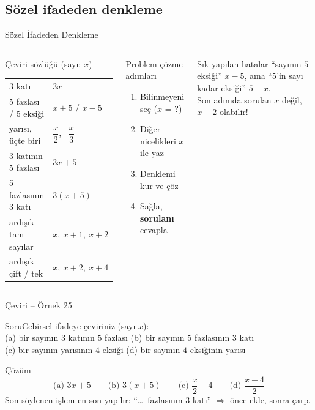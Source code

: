 \documentclass[aspectratio=169,11pt]{beamer}
\newcommand{\soru}[3]{%
\begin{frame}{#1}
  \begin{block}{Soru}\large #2\end{block}
  \pause
  \begin{exampleblock}{Çözüm}\large #3\end{exampleblock}
\end{frame}}
\begin{document}
\subsection{Sözel ifadeden denkleme}
\begin{frame}{Sözel İfadeden Denkleme}
\begin{columns}[t]
\begin{block}{Çeviri sözlüğü (sayı: \(x\))}
\small
\begin{tabular}{@{}ll@{}}
3 katı & \(3x\)\\
5 fazlası / 5 eksiği & \(x+5\) / \(x-5\)\\
yarısı, üçte biri & \(\dfrac{x}{2}\), \ \(\dfrac{x}{3}\)\\[4pt]
3 katının 5 fazlası & \(3x+5\)\\
5 fazlasının 3 katı & \(3(x+5)\)\\
ardışık tam sayılar & \(x,\ x+1,\ x+2\)\\
ardışık çift / tek & \(x,\ x+2,\ x+4\)
\end{tabular}
\end{block}
\begin{block}{Problem çözme adımları}
\begin{enumerate}
\item Bilinmeyeni seç (\(x\) = ?)
\item Diğer nicelikleri \(x\) ile yaz
\item Denklemi kur ve çöz
\item Sağla, \textbf{sorulanı} cevapla
\end{enumerate}
\end{block}
\begin{alertblock}{Sık yapılan hatalar}
\small ``sayının \(5\) eksiği'' \(x-5\), ama ``\(5\)'in sayı kadar eksiği'' \(5-x\).\\
Son adımda sorulan \(x\) değil, \(x+2\) olabilir!
\end{alertblock}
\end{columns}
\end{frame}

\soru{Çeviri -- Örnek 25}
{Cebirsel ifadeye çeviriniz (sayı \(x\)):\\
(a) bir sayının \(3\) katının \(5\) fazlası \quad (b) bir sayının \(5\) fazlasının \(3\) katı\\
(c) bir sayının yarısının \(4\) eksiği \quad (d) bir sayının \(4\) eksiğinin yarısı}
{\[\text{(a) } 3x+5\qquad \text{(b) } 3(x+5)\qquad \text{(c) } \frac{x}{2}-4\qquad \text{(d) } \frac{x-4}{2}\]
Son söylenen işlem en son yapılır: ``\dots\ fazlasının \(3\) katı'' \(\Rightarrow\) önce ekle, sonra çarp.}
\end{document}
